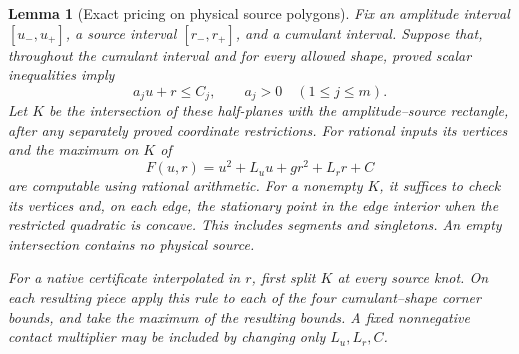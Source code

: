 \documentclass{article}
\newtheorem{lemma}{Lemma}\newtheorem{theorem}{Theorem}\newtheorem{remark}{Remark}
\begin{document}
\begin{lemma}[Exact pricing on physical source polygons]
\label{lem:physical-source-polygon-price}
Fix an amplitude interval $[u_-,u_+]$, a source interval $[r_-,r_+]$,
and a cumulant interval. Suppose that, throughout the cumulant interval
and for every allowed shape, proved scalar inequalities imply
\[
 a_j u+r\le C_j,\qquad a_j>0\quad(1\le j\le m).
\]
Let $K$ be the intersection of these half-planes with the amplitude--source
rectangle, after any separately proved coordinate restrictions.
For rational inputs its vertices and the maximum on $K$ of
\[
 F(u,r)=u^2+L_u u+g r^2+L_r r+C
\]
are computable using rational arithmetic. For a nonempty $K$, it suffices
to check its vertices and, on each edge, the stationary point in the edge
interior when the restricted quadratic is concave. This includes segments
and singletons. An empty intersection contains no physical source.

For a native certificate interpolated in $r$, first split $K$ at every
source knot. On each resulting piece apply this rule to each of the four
cumulant--shape corner bounds, and take the maximum of the resulting
bounds. A fixed nonnegative contact multiplier may be included by changing
only $L_u,L_r,C$.
\end{lemma}
\end{document}
